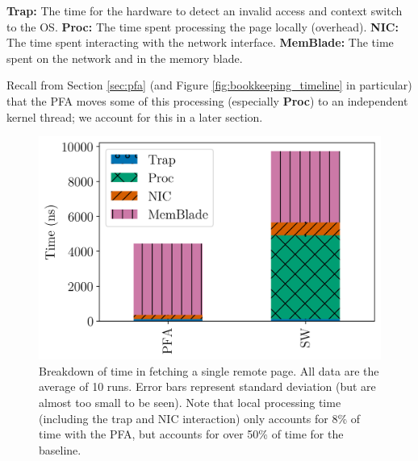   \begin{outline}
    \1 \textbf{Trap:} The time for the hardware to detect an invalid access and
    context switch to the OS.
    \1 \textbf{Proc:} The time spent processing the page locally (overhead).
    \1 \textbf{NIC:} The time spent interacting with the network interface.
    \1 \textbf{MemBlade:} The time spent on the network and in the memory
    blade.
  \end{outline}

  Recall from Section \ref{sec:pfa} (and Figure \ref{fig:bookkeeping_timeline}
  in particular) that the PFA moves some of this processing (especially
  \textbf{Proc}) to an independent kernel thread; we account for this in a
  later section. 

  \begin{figure}[h] \centering
    \includegraphics[width=0.8\columnwidth]{figs/fetch_breakdown.png}
    \caption{Breakdown of time in fetching a single remote page. All data are 
    the average of 10 runs. Error bars represent standard deviation (but are
  almost too small to be seen). Note that local processing time (including
  the trap and NIC interaction) only accounts for 8\% of time with the PFA, but
  accounts for over 50\% of time for the baseline.}
    \label{fig:fetch_breakdown}
  \end{figure}

